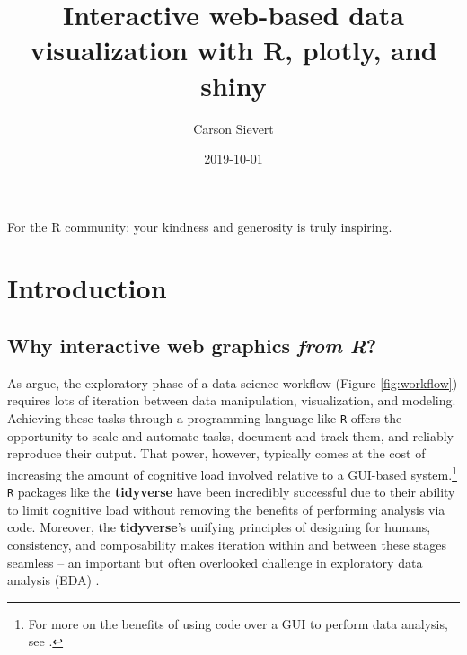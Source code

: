 \documentclass[
  12pt,
]{krantz}
\title{Interactive web-based data visualization with R, plotly, and shiny}
\author{Carson Sievert}
\date{2019-10-01}
\begin{document}
\maketitle

\thispagestyle{empty}
\begin{center}
For the R community: your kindness and generosity is truly inspiring.
\end{center}

\setlength{\abovedisplayskip}{-5pt}
\setlength{\abovedisplayshortskip}{-5pt}

{
\hypersetup{linkcolor=}
\setcounter{tocdepth}{2}
\tableofcontents
}
\mainmatter

\hypertarget{introduction}{%
\chapter{Introduction}\label{introduction}}

\hypertarget{why-interactive-web-graphics-from-r}{%
\section{\texorpdfstring{Why interactive web graphics \emph{from R}?}{Why interactive web graphics from R?}}\label{why-interactive-web-graphics-from-r}}

As \citet{r4ds} argue, the exploratory phase of a data science workflow (Figure \ref{fig:workflow}) requires lots of iteration between data manipulation, visualization, and modeling. Achieving these tasks through a programming language like \texttt{R} offers the opportunity to scale and automate tasks, document and track them, and reliably reproduce their output. That power, however, typically comes at the cost of increasing the amount of cognitive load involved relative to a GUI-based system.\footnote{For more on the benefits of using code over a GUI to perform data analysis, see \citet{data-science-gui}.} \texttt{R} packages like the \textbf{tidyverse} have been incredibly successful due to their ability to limit cognitive load without removing the benefits of performing analysis via code. Moreover, the \textbf{tidyverse}'s unifying principles of designing for humans, consistency, and composability makes iteration within and between these stages seamless -- an important but often overlooked challenge in exploratory data analysis (EDA) \citep{tidy-principles}.
\end{document}
